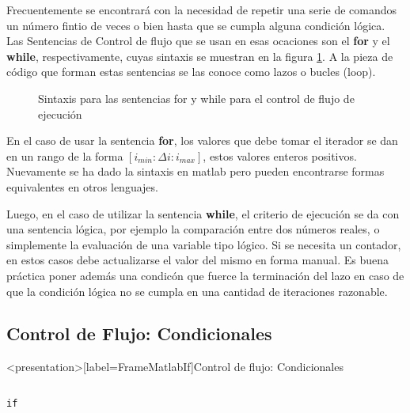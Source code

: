 
Frecuentemente se encontrará con la necesidad de repetir una serie de 
comandos un número fintio de veces o bien hasta que se cumpla alguna 
condición lógica. Las Sentencias de Control de flujo que se usan en esas 
ocaciones son el \textbf{for} y el \textbf{while}, respectivamente, 
cuyas sintaxis se muestran en la figura \ref{FigMatlabForWhile}. A la pieza de
código que forman estas sentencias se las conoce como
lazos o bucles (loop).

\begin{figure}
  \caption{
    Sintaxis para las sentencias for y while
  para el control de flujo de ejecución \label{FigMatlabForWhile}
}
\end{figure}

En el caso de usar la sentencia \textbf{for}, los valores que debe tomar
el iterador se dan en un rango de la forma  $[ i_{min} :  \Delta i : i_{max} ]$, 
estos valores enteros positivos. Nuevamente se ha dado la sintaxis en matlab
pero pueden encontrarse formas equivalentes en otros lenguajes. 

Luego, en el caso de utilizar la sentencia \textbf{while}, el criterio 
de ejecución se da con una sentencia lógica, por ejemplo la comparación
entre dos números reales, o simplemente la evaluación de una 
variable tipo lógico. Si se necesita un contador, en estos casos
debe actualizarse el valor del mismo en forma manual. Es buena
práctica poner además una condicón que fuerce la terminación  
del lazo en caso de que la condición lógica no se cumpla 
en una cantidad de iteraciones razonable. 

\mode*

\subsection{Control de Flujo: Condicionales}

\begin{frame}<presentation>[label=FrameMatlabIf]{Control de flujo: Condicionales} 
\begin{columns}[T]
\hfill \large\texttt{if}

\begin{codeblock}

\end{codeblock}

\begin{codeblock}

\end{codeblock}

\end{columns}
\end{frame}

